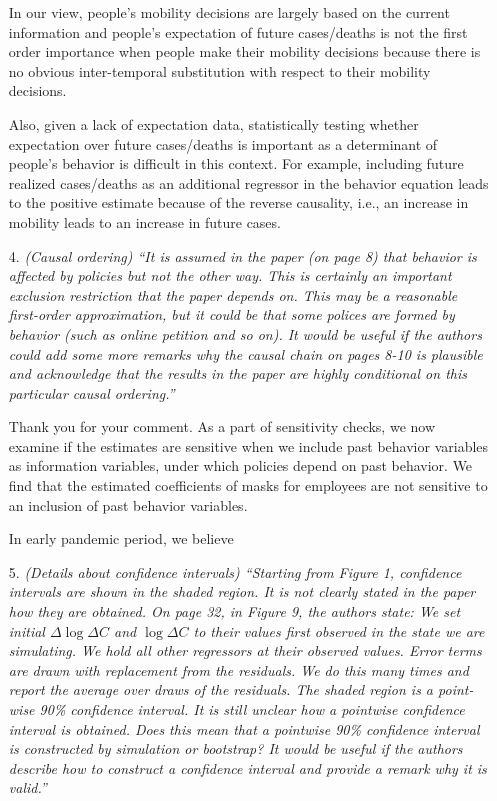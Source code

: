 \documentclass[11pt]{article}
\begin{document}
\begin{itemize}
In our view, people's mobility decisions are largely based on the current information and people's expectation of future cases/deaths is not the first order importance when people make their mobility decisions because there is no obvious inter-temporal substitution with respect to their mobility decisions. 
    
Also, given a lack of expectation data, statistically testing whether expectation over future cases/deaths is important as a determinant of people's behavior is difficult in this context. For example, including future realized cases/deaths as an additional regressor in the behavior equation leads to the positive estimate because of the reverse causality, i.e., an increase in mobility leads to an increase in future cases.
  
\item[4.]  \textit{(Causal ordering) ``It is assumed in the paper (on page 8) that behavior is affected by policies
but not the other way. This is certainly an important exclusion restriction that the paper
depends on. This may be a reasonable first-order approximation, but it could be that some
polices are formed by behavior (such as online petition and so on). It would be useful if
the authors could add some more remarks why the causal chain on pages 8-10 is plausible
and acknowledge that the results in the paper are highly conditional on this particular causal
ordering.''}

Thank you for your comment. As a part of sensitivity checks, we now examine if the estimates are sensitive when we include past behavior variables as information variables, under which policies depend on past behavior. We find that the estimated coefficients of masks for employees are not sensitive to an inclusion of past behavior variables. 

In early pandemic period, we believe 


  
\item[5.]  \textit{(Details about confidence intervals) ``Starting from Figure 1, confidence intervals are shown
in the shaded region. It is not clearly stated in the paper how they are obtained. On page 32,
in Figure 9, the authors state:
We set initial $\Delta\log\Delta C$ and $\log\Delta C$  to their values first observed in the state we
are simulating. We hold all other regressors at their observed values. Error terms
are drawn with replacement from the residuals. We do this many times and report
the average over draws of the residuals. The shaded region is a point-wise 90\%
confidence interval. It is still unclear how a pointwise confidence interval is obtained. Does this mean that a pointwise
90\% confidence interval is constructed by simulation or bootstrap? It would be useful if the authors describe how to construct a confidence interval and provide a remark why it is valid.''}
  

\end{itemize}
\end{document}
